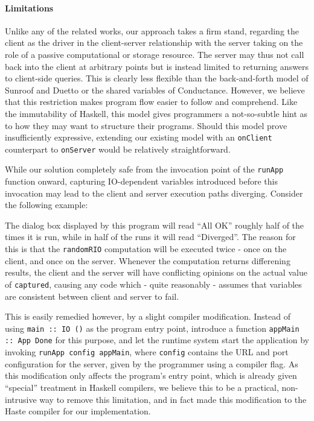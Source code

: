 \documentclass[preprint]{sigplanconf}
\begin{document}
\paragraph{Limitations} Unlike any of the related works, our approach takes a
firm stand, regarding the client as the driver in the client-server
relationship with the server taking on the role of a passive computational
or storage resource. The server may thus not call back into the client at
arbitrary points but is instead limited to returning answers to client-side
queries. This is clearly less flexible than the back-and-forth model of Sunroof
and Duetto or the shared variables of Conductance. However, we believe that
this restriction makes program flow easier to follow and comprehend. Like the
immutability of Haskell, this model gives programmers a not-so-subtle hint
as to how they may want to structure their programs. Should this model prove
insufficiently expressive, extending our existing model with an
\lstinline!onClient! counterpart to \lstinline!onServer! would be relatively
straightforward.

While our solution completely safe from the invocation point of the
\lstinline!runApp! function onward, capturing IO-dependent variables introduced
before this invocation may lead to the client and server execution paths
diverging. Consider the following example:


The dialog box displayed by this program will read ``All OK'' roughly half
of the times it is run, while in half of the runs it will read ``Diverged''.
The reason for this is that the \lstinline!randomRIO! computation will be
executed twice - once on the client, and once on the server. Whenever the
computation returns differening results, the client and the server will have
conflicting opinions on the actual value of \lstinline!captured!, causing any
code which - quite reasonably - assumes that variables are consistent between
client and server to fail.

This is easily remedied however, by a slight compiler modification. Instead of
using \lstinline!main :: IO ()! as the program entry point, introduce a function
\lstinline!appMain :: App Done! for this purpose, and let the runtime system
start the application by invoking \lstinline!runApp config appMain!, where
\lstinline!config! contains the URL and port configuration for the server, given
by the programmer using a compiler flag. As this modification only affects the
program's entry point, which is already given ``special'' treatment in Haskell
compilers, we believe this to be a practical, non-intrusive way to remove this
limitation, and in fact made this modification to the Haste compiler for our
implementation.
\end{document}
